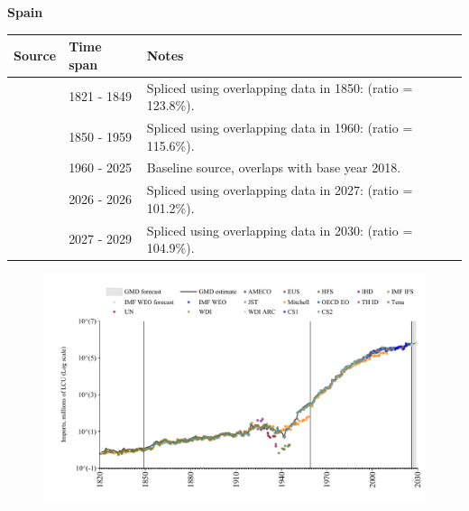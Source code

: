 \documentclass[12pt,a4paper,landscape]{article}
\begin{document}
\begin{adjustbox}{max totalsize={\paperwidth}{\paperheight},center}
\begin{minipage}[t][\textheight][t]{\textwidth}
\vspace*{0.5cm}
{}
\begin{center}
{\Large\bfseries Spain}
\end{center}
\vspace{0.5cm}
\begin{table}[H]
\centering
\small
\begin{tabular}{|l|l|l|}
\hline
\textbf{Source} & \textbf{Time span} & \textbf{Notes} \\
\hline
\rowcolor{white}\cite{Tena}& 1821 - 1849 &Spliced using overlapping data in 1850: (ratio = 123.8\%).\\
\rowcolor{lightgray}\cite{CS2_ESP}& 1850 - 1959 &Spliced using overlapping data in 1960: (ratio = 115.6\%).\\
\rowcolor{white}\cite{OECD_EO}& 1960 - 2025 &Baseline source, overlaps with base year 2018.\\
\rowcolor{lightgray}\cite{AMECO}& 2026 - 2026 &Spliced using overlapping data in 2027: (ratio = 101.2\%).\\
\rowcolor{white}\cite{IMF_WEO_forecast}& 2027 - 2029 &Spliced using overlapping data in 2030: (ratio = 104.9\%).\\
\hline
\end{tabular}
\end{table}
\begin{figure}[H]
\centering
\includegraphics[width=\textwidth,height=0.6\textheight,keepaspectratio]{graphs/ESP_imports.pdf}
\end{figure}
\end{minipage}
\end{adjustbox}
\end{document}
